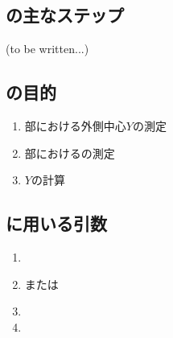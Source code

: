 \subsection{\MXOThickness の主なステップ\TBW}
(to be written...)


\clearpage


\subsection{\MYOThickness の目的}
\begin{enumerate}[label*=\sarrow]
\item \EndFace 部における外側中心$Y$の測定
\item \EndFace 部における\BDOD の測定
\item \KeywayCenter$Y$の計算
\end{enumerate}


\subsection{\MYOThickness に用いる引数}
\begin{enumerate}[label*=\sarrow]
\item \PMBDOD
\item \PMTopReAlocationLength または\PMBottomReAlocationLength
\item \PMKeywayPos
\item \PMKeywayWidth
\end{enumerate}


\clearpage



